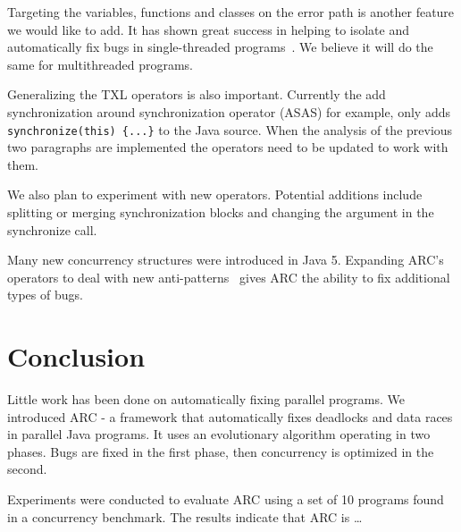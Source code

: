 \documentclass[10pt, conference, compsocconf]{IEEEtran}
\begin{document}
Targeting the variables, functions and classes on the error path is another
feature we would like to add.  It has shown great success in helping to isolate
and automatically fix bugs in single-threaded programs~\cite{FNWG09, NWLF09,
WFGN10, GNFW11}. We believe it will do the same for multithreaded programs.

Generalizing the TXL operators is also important. Currently the add
synchronization around synchronization operator (ASAS) for example, only adds
\texttt{synchronize(this) \{...\}} to the Java source.  When the analysis of
the previous two paragraphs are implemented the operators need to be updated to
work with them.

We also plan to experiment with new operators.  Potential additions include
splitting or merging synchronization blocks and changing the argument in the
synchronize call.

Many new concurrency structures were introduced in Java 5. Expanding ARC's
operators to deal with new anti-patterns~\cite{BJ09, BCD06} gives ARC the 
ability to fix additional types of bugs.

\section{Conclusion}
\label{sec:conclusion}

Little work has been done on automatically fixing parallel programs.  We
introduced ARC - a framework that automatically fixes deadlocks and data
races in parallel Java programs. It uses an evolutionary
algorithm operating in two phases. Bugs are fixed in the first phase, then
concurrency is optimized in the second.

Experiments were conducted to evaluate ARC using a set of 10 programs found in
a concurrency benchmark. The results indicate that ARC is \ldots %







%

\end{document}
